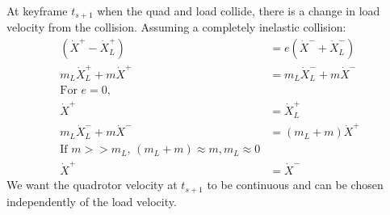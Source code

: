 \documentclass[11pt]{article}
\begin{document}
At keyframe $t_{s+1}$ when the quad and load collide, there is a change in load velocity from the collision. Assuming a completely inelastic collision: 
\begin{align*}
(\dot{X}^+ - \dot{X}_L^+) &= e ( \dot{X}^- + \dot{X}_L^-)\\
m_L \dot{X}_L^+ + m \dot{X}^+ &= m_L \dot{X}_L^- + m \dot{X}^- \\
\text{For $e = 0$, } & \\
\dot{X}^+ &= \dot{X}_L^+ \\
m_L \dot{X}_L^- + m \dot{X}^- &= (m_L+m) \dot{X}^+ \\
\text{If $m >> m_L$, } (m_L+m) \approx m, m_L \approx 0 & \\
 \dot{X}^+ &= \dot{X}^-
\end{align*}
We want the quadrotor velocity at $t_{s+1}$ to be continuous and can be chosen independently of the load velocity. 
\end{document}
